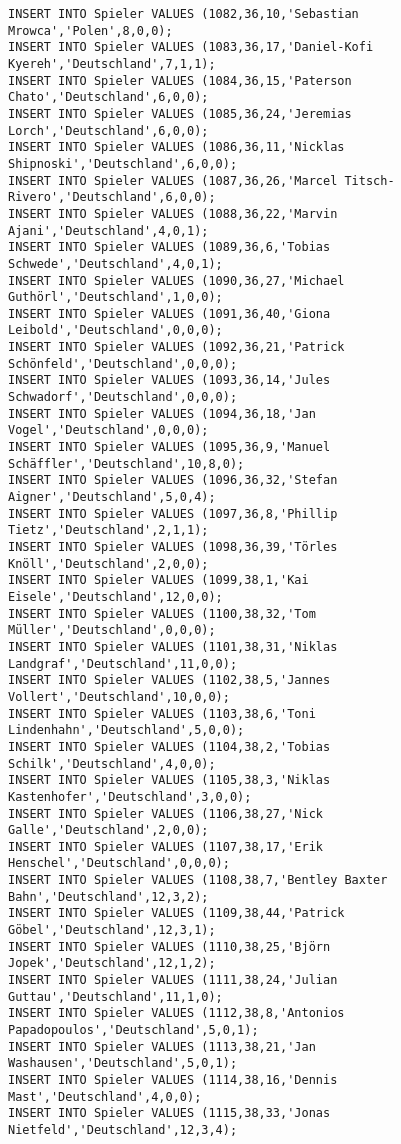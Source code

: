\documentclass{lehramt-informatik-aufgabe}
\begin{document}
\begin{verbatim}
INSERT INTO Spieler VALUES (1082,36,10,'Sebastian Mrowca','Polen',8,0,0);
INSERT INTO Spieler VALUES (1083,36,17,'Daniel-Kofi Kyereh','Deutschland',7,1,1);
INSERT INTO Spieler VALUES (1084,36,15,'Paterson Chato','Deutschland',6,0,0);
INSERT INTO Spieler VALUES (1085,36,24,'Jeremias Lorch','Deutschland',6,0,0);
INSERT INTO Spieler VALUES (1086,36,11,'Nicklas Shipnoski','Deutschland',6,0,0);
INSERT INTO Spieler VALUES (1087,36,26,'Marcel Titsch-Rivero','Deutschland',6,0,0);
INSERT INTO Spieler VALUES (1088,36,22,'Marvin Ajani','Deutschland',4,0,1);
INSERT INTO Spieler VALUES (1089,36,6,'Tobias Schwede','Deutschland',4,0,1);
INSERT INTO Spieler VALUES (1090,36,27,'Michael Guthörl','Deutschland',1,0,0);
INSERT INTO Spieler VALUES (1091,36,40,'Giona Leibold','Deutschland',0,0,0);
INSERT INTO Spieler VALUES (1092,36,21,'Patrick Schönfeld','Deutschland',0,0,0);
INSERT INTO Spieler VALUES (1093,36,14,'Jules Schwadorf','Deutschland',0,0,0);
INSERT INTO Spieler VALUES (1094,36,18,'Jan Vogel','Deutschland',0,0,0);
INSERT INTO Spieler VALUES (1095,36,9,'Manuel Schäffler','Deutschland',10,8,0);
INSERT INTO Spieler VALUES (1096,36,32,'Stefan Aigner','Deutschland',5,0,4);
INSERT INTO Spieler VALUES (1097,36,8,'Phillip Tietz','Deutschland',2,1,1);
INSERT INTO Spieler VALUES (1098,36,39,'Törles Knöll','Deutschland',2,0,0);
INSERT INTO Spieler VALUES (1099,38,1,'Kai Eisele','Deutschland',12,0,0);
INSERT INTO Spieler VALUES (1100,38,32,'Tom Müller','Deutschland',0,0,0);
INSERT INTO Spieler VALUES (1101,38,31,'Niklas Landgraf','Deutschland',11,0,0);
INSERT INTO Spieler VALUES (1102,38,5,'Jannes Vollert','Deutschland',10,0,0);
INSERT INTO Spieler VALUES (1103,38,6,'Toni Lindenhahn','Deutschland',5,0,0);
INSERT INTO Spieler VALUES (1104,38,2,'Tobias Schilk','Deutschland',4,0,0);
INSERT INTO Spieler VALUES (1105,38,3,'Niklas Kastenhofer','Deutschland',3,0,0);
INSERT INTO Spieler VALUES (1106,38,27,'Nick Galle','Deutschland',2,0,0);
INSERT INTO Spieler VALUES (1107,38,17,'Erik Henschel','Deutschland',0,0,0);
INSERT INTO Spieler VALUES (1108,38,7,'Bentley Baxter Bahn','Deutschland',12,3,2);
INSERT INTO Spieler VALUES (1109,38,44,'Patrick Göbel','Deutschland',12,3,1);
INSERT INTO Spieler VALUES (1110,38,25,'Björn Jopek','Deutschland',12,1,2);
INSERT INTO Spieler VALUES (1111,38,24,'Julian Guttau','Deutschland',11,1,0);
INSERT INTO Spieler VALUES (1112,38,8,'Antonios Papadopoulos','Deutschland',5,0,1);
INSERT INTO Spieler VALUES (1113,38,21,'Jan Washausen','Deutschland',5,0,1);
INSERT INTO Spieler VALUES (1114,38,16,'Dennis Mast','Deutschland',4,0,0);
INSERT INTO Spieler VALUES (1115,38,33,'Jonas Nietfeld','Deutschland',12,3,4);

\end{verbatim}
\end{document}
